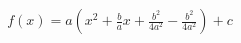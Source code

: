 \documentclass[preview]{standalone}
\begin{document}
\begin{align*}
f(x) = a(x^2 + \frac{b}{a}x + \frac{b^2}{4a^2} - \frac{b^2}{4a^2}) + c
\end{align*}
\end{document}
